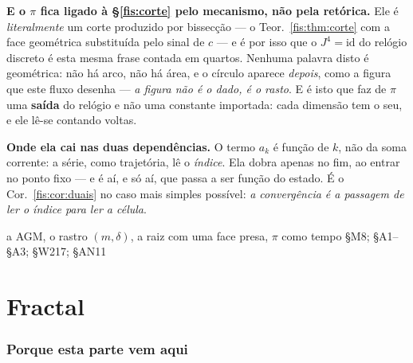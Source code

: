 \documentclass[livro.tex]{subfiles}
\begin{document}
\medskip\noindent\textbf{E o $\pi$ fica ligado à §\ref{fis:corte} pelo
mecanismo, não pela retórica.} Ele é \emph{literalmente} um corte produzido por
bissecção --- o Teor.~\ref{fis:thm:corte} com a face geométrica substituída pelo
sinal de $c$ --- e é por isso que o $J^{4}=\mathrm{id}$ do relógio discreto é
esta mesma frase contada em quartos.
\medskip\noindent Nenhuma palavra disto é geométrica: não há arco, não há área, e
o círculo aparece \emph{depois}, como a figura que este fluxo desenha ---
\emph{a figura não é o dado, é o rasto}. E é isto que faz de $\pi$ uma
\textbf{saída} do relógio e não uma constante importada: cada dimensão tem o seu,
e ele lê-se contando voltas.

\medskip\noindent\textbf{Onde ela cai nas duas dependências.} O termo $a_k$ é
função de $k$, não da soma corrente: a série, como trajetória, lê o
\emph{índice}. Ela dobra apenas no fim, ao entrar no ponto fixo --- e é aí, e só
aí, que passa a ser função do estado. É o Cor.~\ref{fis:cor:duais} no caso mais
simples possível: \emph{a convergência é a passagem de ler o índice para ler a
célula}.


        {a AGM, o rastro $(m,\delta)$, a raiz com uma face presa, $\pi$ como tempo}
        { §M8;  §A1--§A3;  §W217;  §AN11}

\part{Fractal}

\section{Porque esta parte vem aqui}\label{fis:alonzo}
\end{document}
